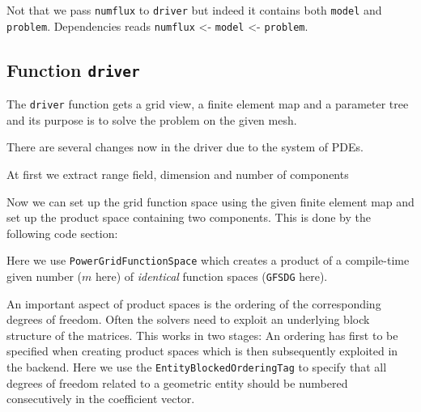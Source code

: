 \documentclass[a4paper,12pt]{article}
\theoremstyle{definition}
\theoremstyle{definition}
\begin{document}
Not that we pass \lstinline{numflux} to \lstinline{driver} but indeed it contains both \lstinline{model}   and \lstinline{problem}. Dependencies reads
\lstinline{numflux} <- \lstinline{model} <- \lstinline{problem}.
\subsection{Function \lstinline{driver}}
\label{sec:funct-driver}

The \lstinline{driver} function gets a grid view, a finite element
map and a parameter tree and its purpose is to solve the problem on
the given mesh.

There are several changes now in the driver due to the system of PDEs.

At first we extract range field, dimension and number of components




Now we can set up the grid function space using the given finite
element map and set up the product space containing
two components. This is done by the following code section:



Here we use \lstinline{PowerGridFunctionSpace} which creates
a product of a compile-time given number ($m$ here) of \textit{identical} function spaces (\lstinline{GFSDG} here).


An important aspect of product spaces is the ordering of the corresponding degrees
of freedom. Often the solvers need to exploit an underlying block structure
of the matrices. This works in two stages: An ordering has first to be specified when creating product spaces
which is then subsequently exploited in the backend.
Here we use the \lstinline{EntityBlockedOrderingTag} to specify that all degrees of
freedom related to a geometric entity should be numbered consecutively in
the coefficient vector.



\end{document}
